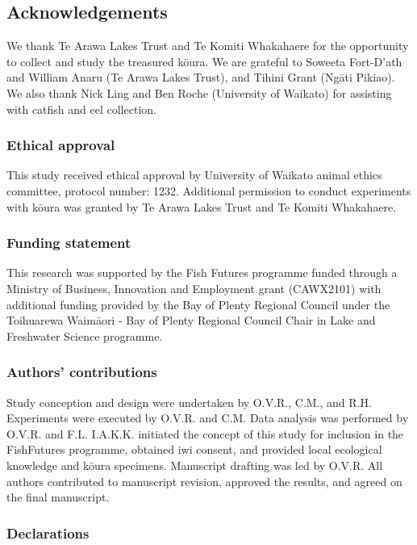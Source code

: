 \documentclass[
  letterpaper,
  DIV=11,
  numbers=noendperiod]{scrartcl}
\begin{document}
\subsection{Acknowledgements}\label{acknowledgements}

We thank Te Arawa Lakes Trust and Te Komiti Whakahaere for the
opportunity to collect and study the treasured kōura. We are grateful to
Soweeta Fort-D'ath and William Anaru (Te Arawa Lakes Trust), and Tihini
Grant (Ngāti Pikiao). We also thank Nick Ling and Ben Roche (University
of Waikato) for assisting with catfish and eel collection.

\subsubsection{Ethical approval}\label{ethical-approval}

This study received ethical approval by University of Waikato animal
ethics committee, protocol number: 1232. Additional permission to
conduct experiments with kōura was granted by Te Arawa Lakes Trust and
Te Komiti Whakahaere.

\subsubsection{Funding statement}\label{funding-statement}

This research was supported by the Fish Futures programme funded through
a Ministry of Business, Innovation and Employment grant (CAWX2101) with
additional funding provided by the Bay of Plenty Regional Council under
the Toihuarewa Waimāori - Bay of Plenty Regional Council Chair in Lake
and Freshwater Science programme.

\subsubsection{Authors' contributions}\label{authors-contributions}

Study conception and design were undertaken by O.V.R., C.M., and R.H.
Experiments were executed by O.V.R. and C.M. Data analysis was performed
by O.V.R. and F.L. I.A.K.K. initiated the concept of this study for
inclusion in the FishFutures programme, obtained iwi consent, and
provided local ecological knowledge and kōura specimens. Manuscript
drafting was led by O.V.R. All authors contributed to manuscript
revision, approved the results, and agreed on the final manuscript.

\subsubsection{Declarations}\label{declarations}
\end{document}
